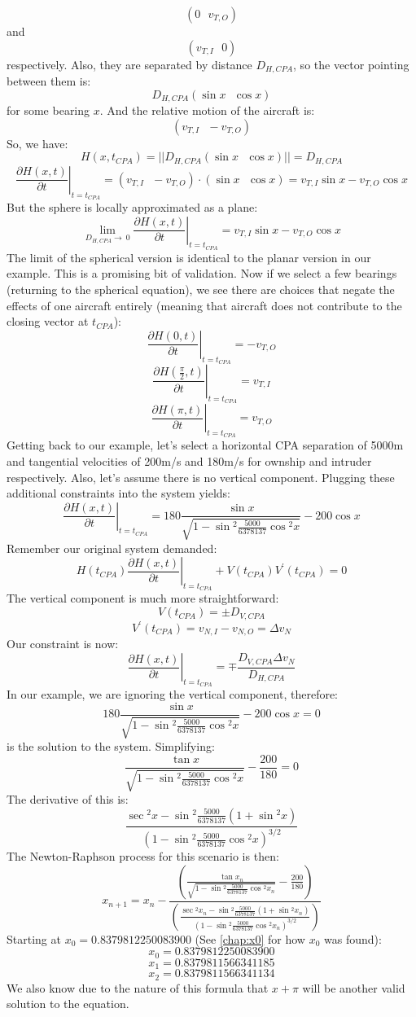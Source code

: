 \begin{theappendices}
\[(0 \ \ \ v_{T,O})\]
and
\[(v_{T,I} \ \ \ 0)\]
respectively. Also, they are separated by distance \(D_{H,CPA}\), so the vector pointing between them is:
\[D_{H,CPA}(\sin{x} \ \ \ \cos{x})\]
for some bearing \(x\). And the relative motion of the aircraft is:
\[(v_{T,I} \ \ \ -v_{T,O})\]
So, we have:
\[H(x,t_{CPA}) = ||D_{H,CPA}(\sin{x} \ \ \ \cos{x}) || = D_{H,CPA}\]
\[\left. \frac{\partial H(x,t)}{\partial t} \right|_{t=t_{CPA}} = (v_{T,I} \ \ \ -v_{T,O}) \cdot (\sin{x} \ \ \ \cos{x}) = v_{T,I}\sin{x}-v_{T,O}\cos{x}\]
But the sphere is locally approximated as a plane:
\[ \lim_{D_{H,CPA}\to\ 0} \left. \frac{\partial H(x,t)}{\partial t} \right|_{t=t_{CPA}} = v_{T,I}\sin{x} - v_{T,O}\cos{x} \]
The limit of the spherical version is identical to the planar version in our example. This is a promising bit of validation. Now if we select a few bearings (returning to the spherical equation), we see there are choices that negate the effects of one aircraft entirely (meaning that aircraft does not contribute to the closing vector at \(t_{CPA}\)):
\[ \left. \frac{\partial H(0,t)}{\partial t} \right|_{t=t_{CPA}} = -v_{T,O} \]
\[ \left. \frac{\partial H(\frac{\pi}{2},t)}{\partial t} \right|_{t=t_{CPA}} = v_{T,I} \]
\[ \left. \frac{\partial H(\pi,t)}{\partial t} \right|_{t=t_{CPA}} = v_{T,O} \]
Getting back to our example, let’s select a horizontal CPA separation of 5000m and tangential velocities of 200m/s and 180m/s for ownship and intruder respectively. Also, let’s assume there is no vertical component. Plugging these additional constraints into the system yields:
\[ \left. \frac{\partial H(x,t)}{\partial t} \right|_{t=t_{CPA}} = 180\frac{\sin{x}}{\sqrt{1-\sin{^{2}\frac{5000}{6378137}}\cos{^{2}x}}} - 200\cos{x} \]
Remember our original system demanded:
\[ H(t_{CPA})\left. \frac{\partial H(x,t)}{\partial t} \right|_{t=t_{CPA}} + V(t_{CPA})V^{'}(t_{CPA}) = 0 \]
The vertical component is much more straightforward:
\[ V(t_{CPA}) = \pm D_{V,CPA} \]
\[ V^{'}(t_{CPA}) = v_{N,I} - v_{N,O} = \Delta v_{N} \]
Our constraint is now:
\[ \left. \frac{\partial H(x,t)}{\partial t} \right|_{t=t_{CPA}} = \mp \frac{D_{V,CPA} \Delta v_{N}}{D_{H,CPA}} \]
In our example, we are ignoring the vertical component, therefore:
\[ 180 \frac{\sin{x}}{\sqrt{1-\sin{^{2}\frac{5000}{6378137}}\cos{^{2}x}}} - 200\cos{x} = 0 \]
is the solution to the system. Simplifying:
\[ \frac{\tan{x}}{\sqrt{1-\sin{^{2}\frac{5000}{6378137}}\cos{^{2}x}}}-\frac{200}{180} = 0 \]
The derivative of this is:
\[ \frac{\sec{^{2}x} - \sin{^{2}\frac{5000}{6378137}(1+\sin{^{2}x})}}{\left( 1-\sin{^{2}\frac{5000}{6378137}\cos{^{2}x}} \right)^{3/2}} \]
The Newton-Raphson process for this scenario is then:
\[ x_{n+1} = x_{n} - \frac{\left( \frac{\tan{x_{n}}}{\sqrt{1-\sin{^{2}\frac{5000}{6378137}}\cos{^{2}x_{n}}}} - \frac{200}{180}\right)}{\left( 
\frac{\sec{^{2}x_{n}} - \sin{^{2}\frac{5000}{6378137}(1+\sin{^{2}x_{n}})}}{\left( 1-\sin{^{2}\frac{5000}{6378137}\cos{^{2}x_{n}}} \right)^{3/2}} \right)}\]
Starting at \(x_{0} = 0.8379812250083900\) (See \autoref{chap:x0} for how \(x_{0}\) was found):
\[ x_{0} = 0.8379812250083900 \]
\[ x_{1} = 0.8379811566341185 \]
\[ x_{2} = 0.8379811566341134 \]
We also know due to the nature of this formula that \(x+\pi\) will be another valid solution to the equation.


\end{theappendices}
